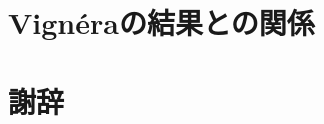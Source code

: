 \documentclass[11pt,b5paper,oneside,lualatex]{ltjsarticle} %
\numberwithin{equation}{section} %
\begin{document}

\section{Vign\'{e}raの結果との関係} \label{sec:}








\section{} \label{sec:}







\section*{謝辞}







\end{document}
